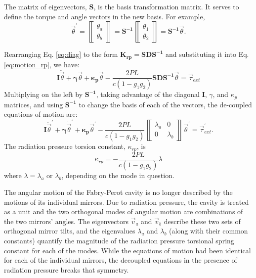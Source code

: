 The matrix of eigenvectors, $\mathbf{S}$, is the basis transformation
matrix. It serves to define the torque and angle vectors in the new
basis. For example,
\begin{equation}
\vec{\theta}^\prime = \left\llbracket \begin{array}{c}
\theta_a\\
\theta_b \end{array} \right\rrbracket = \mathbf{S^{-1}}
\left\llbracket \begin{array}{c}
\theta_1\\
\theta_2 \end{array} \right\rrbracket
= \mathbf{S^{-1}} \vec{\theta}.
\end{equation}

Rearranging Eq. \ref{eq:diag} to the form $\mathbf{K_{rp}} =
\mathbf{S D S^{-1}}$ and substituting it into Eq. \ref{eq:motion_rp},
we have:
\begin{equation}
\mathbf{I} \ddot{\vec{\theta}} 
+ {\bm \gamma} \dot{\vec{\theta}} 
+ \mathbf{\kappa_p} \vec{\theta}
- \frac{2 P L}{c (1-g_1 g_2)} \mathbf{S D S^{-1}} \vec{\theta} 
= \vec{\tau}_{ext} 
\end{equation}
Multiplying on the left by $\mathbf{S^{-1}}$, taking advantage of the
diagonal $\mathbf{I}$, $\gamma$, and $\kappa_p$ matrices, and using
$\mathbf{S^{-1}}$ to change the basis of each of the vectors, the
de-coupled equations of motion are:
\begin{equation}
\mathbf{I} \ddot{\vec{\theta}}^\prime 
+ {\bm \gamma} \dot{\vec{\theta}}^\prime 
+ \mathbf{\kappa_p} \vec{\theta}^\prime
- \frac{2 P L}{c (1-g_1 g_2)}
\left\llbracket \begin{array}{cc}
\lambda_a & 0\\
0 & \lambda_b \end{array} \right\rrbracket \vec{\theta}^\prime 
= \vec{\tau}_{ext}^\prime.
\label{eq:rp_eqmotion}
\end{equation}
The radiation pressure torsion constant, $\kappa_{rp}$, is 
\begin{equation}
\kappa_{rp} = - \frac{2 P L}{c (1-g_1 g_2)} \lambda
\end{equation}
where $\lambda = \lambda_a$ or $\lambda_b$, depending on the mode in
question. 

The angular motion of the Fabry-Perot cavity is no longer
described by the motions of its individual mirrors. Due to radiation
pressure, the cavity is treated as a unit and the two orthogonal modes
of angular motion are combinations of the two mirrors' angles. The
eigenvectors $\vec{v}_a$ and $\vec{v}_b$ describe these two sets of
orthogonal mirror tilts, and the eigenvalues $\lambda_a$ and
$\lambda_b$ (along with their common constants) quantify the magnitude
of the radiation pressure torsional spring constant for each of the
modes. While the equations of motion had been identical for each of
the individual mirrors, the decoupled equations in the presence of
radiation pressure breaks that symmetry.


